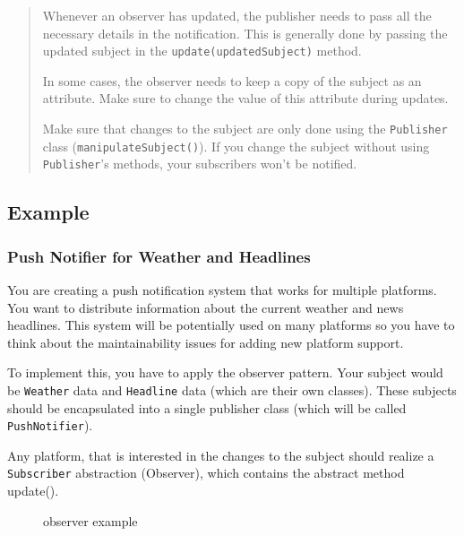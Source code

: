 \begin{quote}
Whenever an observer has updated, the publisher needs to pass all the
necessary details in the notification. This is generally done by passing
the updated subject in the \texttt{update(updatedSubject)} method.

In some cases, the observer needs to keep a copy of the subject as an
attribute. Make sure to change the value of this attribute during
updates.

Make sure that changes to the subject are only done using the
\texttt{Publisher} class (\texttt{manipulateSubject()}). If you change
the subject without using \texttt{Publisher}'s methods, your subscribers
won't be notified.
\end{quote}

\subsection{Example}\label{behavioral-patterns.md__example-3}

\subsubsection{Push Notifier for Weather and
Headlines}\label{behavioral-patterns.md__push-notifier-for-weather-and-headlines}

You are creating a push notification system that works for multiple
platforms. You want to distribute information about the current weather
and news headlines. This system will be potentially used on many
platforms so you have to think about the maintainability issues for
adding new platform support.

To implement this, you have to apply the observer pattern. Your subject
would be \texttt{Weather} data and \texttt{Headline} data (which are
their own classes). These subjects should be encapsulated into a single
publisher class (which will be called \texttt{PushNotifier}).

Any platform, that is interested in the changes to the subject should
realize a \texttt{Subscriber} abstraction (Observer), which contains the
abstract method update().

\begin{figure}
\centering
{}
\caption{observer example}
\end{figure}

